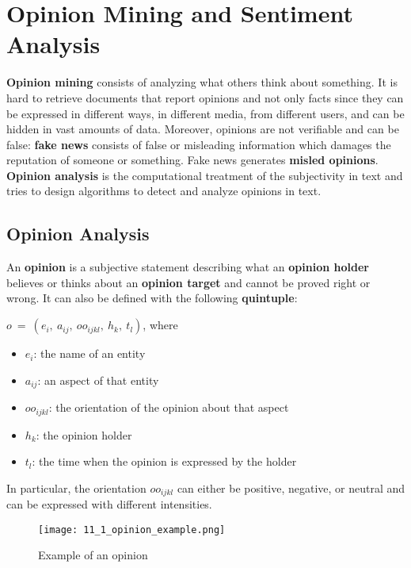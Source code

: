 \documentclass{article}
\begin{document}
\newpage

\section{Opinion Mining and Sentiment Analysis}
\textbf{Opinion mining} consists of analyzing what others think about something. It is hard to retrieve documents that report opinions and not only facts since they can be expressed in different ways, in different media, from different users, and can be hidden in vast amounts of data. Moreover, opinions are not verifiable and can be false: \textbf{fake news} consists of false or misleading information which damages the reputation of someone or something. Fake news generates \textbf{misled opinions}. \\
\textbf{Opinion analysis} is the computational treatment of the subjectivity in text and tries to design algorithms to detect and analyze opinions in text.

\subsection{Opinion Analysis}
An \textbf{opinion} is a subjective statement describing what an \textbf{opinion holder} believes or thinks about an \textbf{opinion target} and cannot be proved right or wrong. It can also be defined with the following \textbf{quintuple}:
\begin{center}
    $o \ = \ (e_i, \ a_{ij}, \ oo_{ijkl}, \ h_k, \ t_l)$, where
\end{center}
\begin{itemize}
    \item $e_i$: the name of an entity
    \item $a_{ij}$: an aspect of that entity
    \item $oo_{ijkl}$: the orientation of the opinion about that aspect
    \item $h_k$: the opinion holder
    \item $t_l$: the time when the opinion is expressed by the holder
\end{itemize}
In particular, the orientation $oo_{ijkl}$ can either be positive, negative, or neutral and can be expressed with different intensities.
\begin{figure}[H]
    \centering
    \texttt{[image: 11\_1\_opinion\_example.png]}
    \caption{Example of an opinion}
\end{figure}
\end{document}
